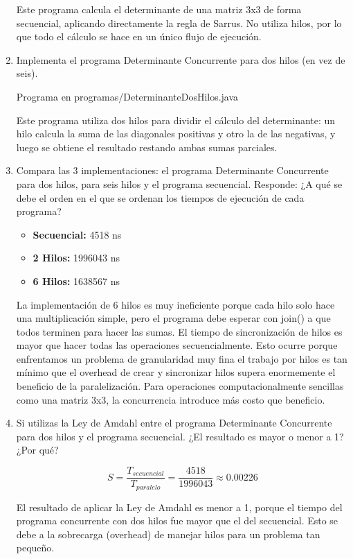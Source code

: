 \documentclass[12pt]{article}
\begin{document}
\begin{enumerate}
      Este programa calcula el determinante de una matriz 3x3 de forma secuencial, 
aplicando directamente la regla de Sarrus.  No utiliza hilos, por lo que todo el cálculo se hace en un único flujo de ejecución. 
    \item Implementa el programa Determinante Concurrente para dos hilos (en vez de seis).

      Programa en programas/DeterminanteDosHilos.java

      Este programa utiliza dos hilos para dividir el cálculo del determinante: 
un hilo calcula la suma de las diagonales positivas y otro la de las negativas, 
y luego se obtiene el resultado restando ambas sumas parciales.
    \item Compara las 3 implementaciones: el programa Determinante Concurrente para dos hilos, para seis hilos y el programa secuencial. Responde: ¿A qué se debe el orden en el que se ordenan los tiempos de ejecución de cada programa?

    \begin{itemize}
    \item \textbf{Secuencial:} 4518 ns
    \item \textbf{2 Hilos:} 1996043 ns
    \item \textbf{6 Hilos:} 1638567 ns
    \end{itemize}

    La implementación de 6 hilos es muy ineficiente porque cada hilo solo hace una multiplicación simple, pero el programa debe esperar con join() a que todos terminen para hacer las sumas. El tiempo de sincronización de hilos es mayor que hacer todas las operaciones secuencialmente.
    Esto ocurre porque enfrentamos un problema de granularidad muy fina el trabajo por hilos es tan mínimo que el overhead de crear y sincronizar hilos supera enormemente el beneficio de la paralelización. Para operaciones computacionalmente sencillas como una matriz 3x3, la concurrencia introduce más costo que beneficio.

    \item Si utilizas la Ley de Amdahl entre el programa Determinante Concurrente para dos hilos y el programa secuencial. ¿El resultado es mayor o menor a 1? ¿Por qué?

    \[S = \frac{T_{secuencial}}{T_{paralelo}} = \frac{4518}{1996043} \approx 0.00226\]


    El resultado de aplicar la Ley de Amdahl es menor a 1, porque el tiempo del programa concurrente con dos hilos fue mayor que el del secuencial. Esto se debe a la sobrecarga (overhead) de manejar hilos para un problema tan pequeño.
    

\end{enumerate}
\end{document}
